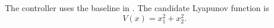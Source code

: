 \documentclass{article}
\begin{document}
The controller uses the baseline in \cite{knownReference}. The candidate Lyapunov function is
\[
  V(x) = x_1^2 + x_2^2.
\]
\end{document}

